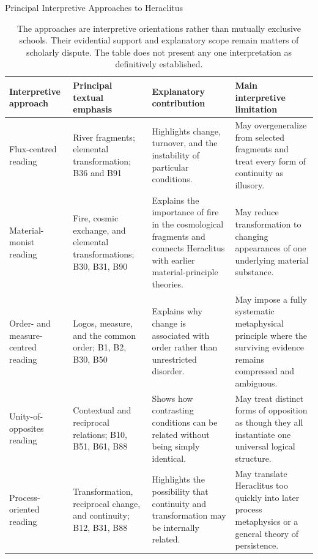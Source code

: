 \begin{table}[htbp]
\centering
\small

\caption{Principal Interpretive Approaches to Heraclitus}
\label{tab:VS.B01.P01.C08.S03.SS07.P003.TL01}

\begin{tabularx}{\textwidth}{
    >{\raggedright\arraybackslash}p{2.55cm}
    >{\raggedright\arraybackslash}p{2.7cm}
    Y
    Y
}
\toprule
\textbf{Interpretive approach}
&
\textbf{Principal textual emphasis}
&
\textbf{Explanatory contribution}
&
\textbf{Main interpretive limitation}
\\
\midrule

Flux-centred reading
&
River fragments; elemental transformation; B36 and B91
&
Highlights change, turnover, and the instability of particular
conditions.
&
May overgeneralize from selected fragments and treat every form
of continuity as illusory.
\\

Material-monist reading
&
Fire, cosmic exchange, and elemental transformations; B30, B31, B90
&
Explains the importance of fire in the cosmological fragments
and connects Heraclitus with earlier material-principle theories.
&
May reduce transformation to changing appearances of one
underlying material substance.
\\

Order- and measure-centred reading
&
Logos, measure, and the common order; B1, B2, B30, B50
&
Explains why change is associated with order rather than
unrestricted disorder.
&
May impose a fully systematic metaphysical principle where
the surviving evidence remains compressed and ambiguous.
\\

Unity-of-opposites reading
&
Contextual and reciprocal relations; B10, B51, B61, B88
&
Shows how contrasting conditions can be related without
being simply identical.
&
May treat distinct forms of opposition as though they all
instantiate one universal logical structure.
\\

Process-oriented reading
&
Transformation, reciprocal change, and continuity; B12, B31, B88
&
Highlights the possibility that continuity and transformation
may be internally related.
&
May translate Heraclitus too quickly into later process
metaphysics or a general theory of persistence.
\\

\bottomrule
\end{tabularx}

\caption*{\footnotesize
The approaches are interpretive orientations rather than mutually
exclusive schools. Their evidential support and explanatory scope
remain matters of scholarly dispute. The table does not present
any one interpretation as definitively established.
}

\end{table}

